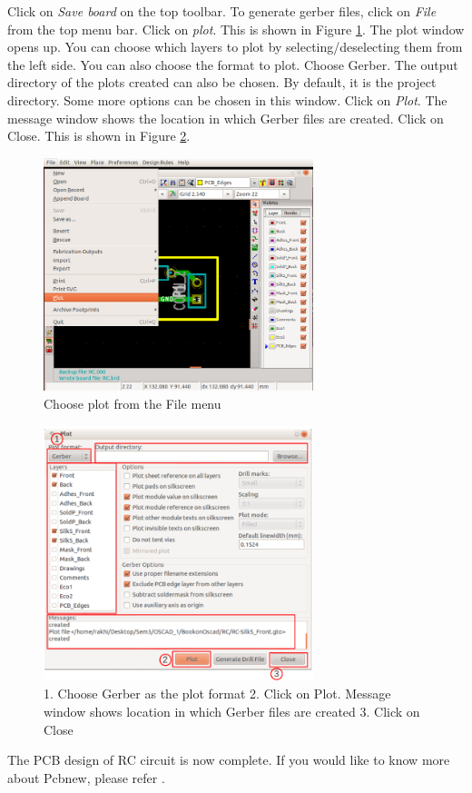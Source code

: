 Click on \textit{Save board} on the top toolbar. To generate gerber files, click on \textit{File} from the top menu bar. Click on \textit{plot}. This is shown in Figure \ref{plot}. The plot window opens up. You can choose which layers to plot by selecting/deselecting them from the left side.
You can also choose the format to plot. Choose Gerber. The output directory of the plots created can also be chosen. By default, it is the project directory. Some more options can be chosen in this window. Click on \textit{Plot}. The message window shows the location in which Gerber files are created. Click on Close. This is shown in Figure \ref{plot2}.
\begin{figure}
\centering
\includegraphics[width=0.7\textwidth]{figures/plot}
\caption{Choose plot from the File menu}
\label{plot}
\end{figure}
\begin{figure}
\centering
\includegraphics[width=0.7\textwidth]{figures/plot2}
\caption{1. Choose Gerber as the plot format 2. Click on Plot. Message window shows location in which Gerber files are created 3. Click on Close}
\label{plot2}
\end{figure}

The PCB design of RC circuit is now complete. If you would like to know more about Pcbnew, please refer \cite{eeschema}.

